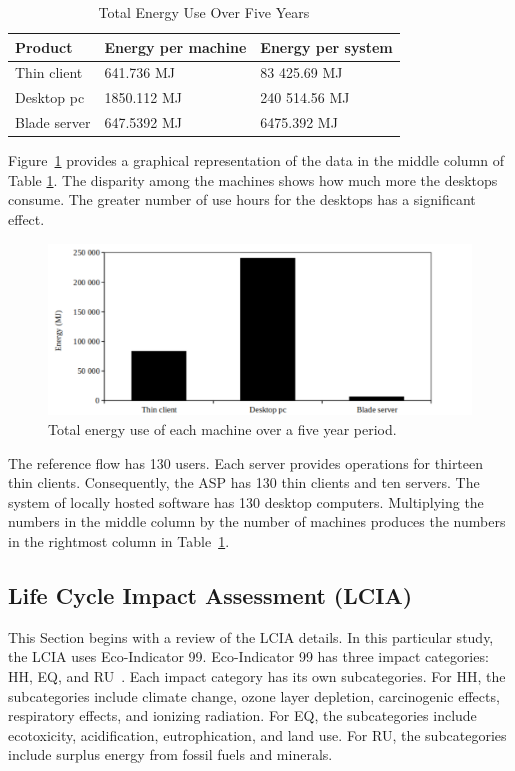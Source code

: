 \documentclass[final,journal,10pt,letterpaper,oneside,twocolumn,compsoc]%
{IEEEtran}
\begin{document}
\begin{table}[htbp]
  \caption{Total Energy Use Over Five Years}
  \label{tab:7}
  \centering
    \begin{tabular}{|l|l|l|}
    \hline
    Product      & Energy per machine & Energy per system \\
    \hline
    Thin client  & 641.736 MJ         & 83 425.69 MJ \\
    Desktop pc   & 1850.112 MJ        & 240 514.56 MJ \\
    Blade server & 647.5392 MJ        & 6475.392 MJ \\
    \hline
    \end{tabular}
\end{table}

Figure~\ref{fig:tab1} provides a graphical representation of the data in the
middle column of Table \ref{tab:7}. The disparity among the machines shows how
much more the desktops consume. The greater number of use hours for the desktops
has a significant effect.

\begin{figure}[htbp]
  \centering
    \includegraphics[scale=0.425]{total_energy_use_over_five_years}
  \caption{Total energy use of each machine over a five year period.}
  \label{fig:tab1}
\end{figure}

The reference flow has 130 users. Each server provides operations for thirteen
thin
clients. Consequently, the ASP has 130 thin clients and ten servers. The system
of locally hosted software has 130 desktop computers. Multiplying the numbers in
the middle column by the number of machines produces the numbers in the
rightmost column in Table~\ref{tab:7}.

\subsection{Life Cycle Impact Assessment (LCIA)}
This Section begins with a review of the LCIA details. In this particular study,
the LCIA uses
Eco-Indicator 99. Eco-Indicator 99 has three impact categories: HH,
EQ, and RU~\cite{pre}. Each impact category has its own
subcategories. For HH, the subcategories include climate
change, ozone layer depletion, carcinogenic effects, respiratory effects, and
ionizing radiation. For EQ, the subcategories include ecotoxicity,
acidification, eutrophication, and land use. For RU, the subcategories
include surplus energy from fossil fuels and minerals. 
\end{document}
